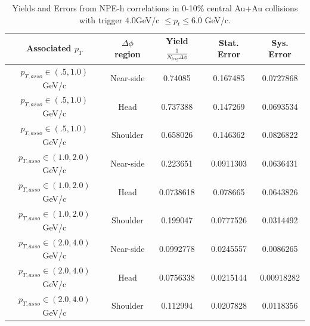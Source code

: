 \begin{table}
\centering
\begin{tabular}{|c|c|c|c|c|}
\hline
Associated $p_T$	& $\Delta\phi$ region & Yield $\frac{1}{N_{trig} \Delta\phi}$ & Stat. Error & Sys. Error\\
\hline
$p_{T,asso} \in(.5, 1.0)$ GeV/c  & Near-side & 0.74085 & 0.167485 & 0.0727868 \\
\hline
$p_{T,asso} \in(.5, 1.0)$ GeV/c  & Head & 0.737388 & 0.147269 & 0.0693534 \\
\hline
$p_{T,asso} \in(.5, 1.0)$ GeV/c  & Shoulder & 0.658026 & 0.146362 & 0.0826822 \\
\hline
$p_{T,asso} \in(1.0, 2.0)$ GeV/c  & Near-side & 0.223651 & 0.0911303 & 0.0636431 \\
\hline
$p_{T,asso} \in(1.0, 2.0)$ GeV/c  & Head & 0.0738618 & 0.078665 & 0.0643826 \\
\hline
$p_{T,asso} \in(1.0, 2.0)$ GeV/c  & Shoulder & 0.199047 & 0.0777526 & 0.0314492 \\
\hline
$p_{T,asso} \in(2.0, 4.0)$ GeV/c  & Near-side & 0.0992778 & 0.0245557 & 0.0086265 \\
\hline
$p_{T,asso} \in(2.0, 4.0)$ GeV/c  & Head & 0.0756338 & 0.0215144 & 0.00918282 \\
\hline
$p_{T,asso} \in(2.0, 4.0)$ GeV/c  & Shoulder & 0.112994 & 0.0207828 & 0.0118356 \\
\hline
\end{tabular}
\caption[Yields and Errors in Au+Au Correlations, 0-10\%, Low Trigger]{Yields and Errors from NPE-h correlations in 0-10\% central Au+Au collisions with trigger $4.0 $GeV/c $\leq p_t \leq 6.0$ GeV/c.}
\label{tab:AuAuYieldCentLow}
\end{table} 

